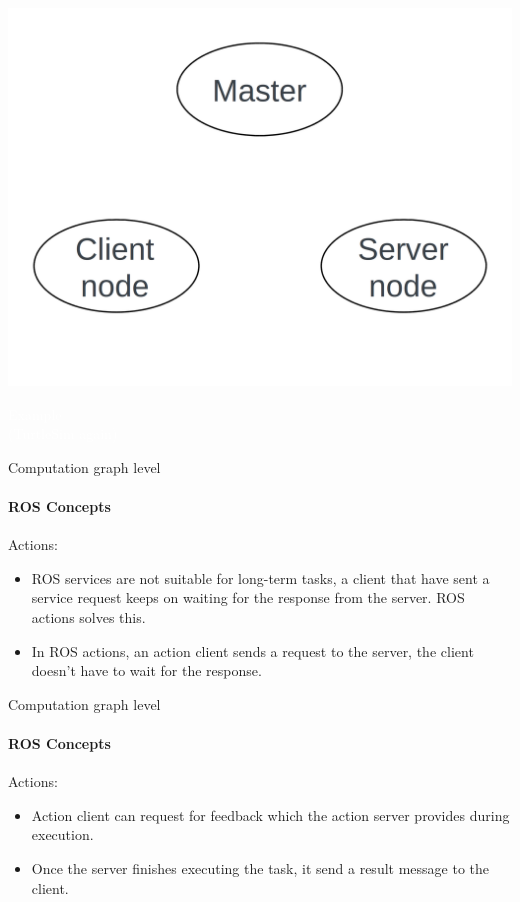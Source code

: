 \documentclass{beamer}
\begin{document}
\begin{frame}[plain]{}
    \centering
    \includegraphics[width =1.0\linewidth]{figures/service1.png}                                                              
  \end{frame}       
     

\begin{frame}[plain]{}  
    \centering
    {\huge \textcolor{white}{Example \\ (TurtleSim again)} }
   \end{frame}
     
        
\begin{frame}{Computation graph level}
    \framesubtitle{ROS Concepts}
    {\huge Actions:}
    \vspace{0.2cm}
    \begin{itemize}
        \item ROS services are not suitable for long-term tasks, a client that have sent a service request keeps on waiting for the response from the server. ROS actions solves this.
        
        \item In ROS actions, an action client sends a request to the server, the client doesn't have to wait for the response.

    \end{itemize}  
\end{frame}


\begin{frame}{Computation graph level}
    \framesubtitle{ROS Concepts}
    {\huge Actions:}
    \vspace{0.2cm}
    \begin{itemize}        
        \item Action client can  request for feedback which the action server provides during execution. 
        
        \item Once the server finishes executing the task, it send a result message to the client.
    \end{itemize}  
\end{frame}
\end{document}
